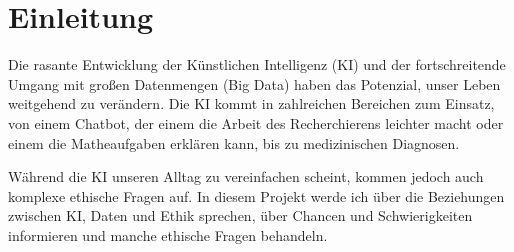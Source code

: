 \chapter{Einleitung}
\label{chap:einleitung}

Die rasante Entwicklung der Künstlichen Intelligenz (KI) und der fortschreitende Umgang mit großen Datenmengen (Big Data) haben das Potenzial, unser Leben weitgehend zu verändern. Die KI kommt in zahlreichen Bereichen zum Einsatz, von einem Chatbot, der einem die Arbeit des Recherchierens leichter macht oder einem die Matheaufgaben erklären kann, bis zu medizinischen Diagnosen. 

Während die KI unseren Alltag zu vereinfachen scheint, kommen jedoch auch komplexe ethische Fragen auf. In diesem Projekt werde ich über die Beziehungen zwischen KI, Daten und Ethik sprechen, über Chancen und Schwierigkeiten informieren und manche ethische Fragen behandeln.

